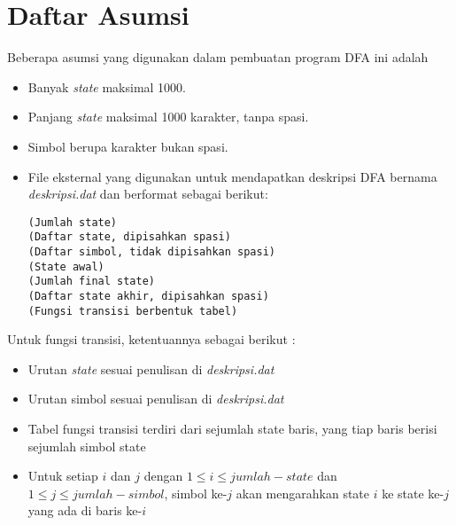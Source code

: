 \section{Daftar Asumsi}
\label{sec:asumsi}
Beberapa asumsi yang digunakan dalam pembuatan program DFA ini adalah
\begin{itemize}
  \item Banyak \textit{state} maksimal 1000.
  \item Panjang \textit{state} maksimal 1000 karakter, tanpa spasi.
  \item Simbol berupa karakter bukan spasi.
  \item File eksternal yang digunakan untuk mendapatkan deskripsi DFA bernama \textit{deskripsi.dat} dan berformat sebagai berikut:

  \begin{lstlisting}[frame=single]
(Jumlah state)
(Daftar state, dipisahkan spasi)
(Daftar simbol, tidak dipisahkan spasi)
(State awal)
(Jumlah final state)
(Daftar state akhir, dipisahkan spasi)
(Fungsi transisi berbentuk tabel)
\end{lstlisting}
\end{itemize}
Untuk fungsi transisi, ketentuannya sebagai berikut :
\begin{itemize}
  \item Urutan \textit{state} sesuai penulisan di \textit{deskripsi.dat}
  \item Urutan simbol sesuai penulisan di \textit{deskripsi.dat}
  \item Tabel fungsi transisi terdiri dari sejumlah state baris, yang tiap baris berisi sejumlah simbol state
  \item Untuk setiap $i$ dan $j$ dengan $1 \leq i \leq jumlah-state$ dan $1 \leq j \leq jumlah-simbol$, simbol ke-$j$ akan mengarahkan state $i$ ke state ke-$j$ yang ada di baris ke-$i$
\end{itemize}
